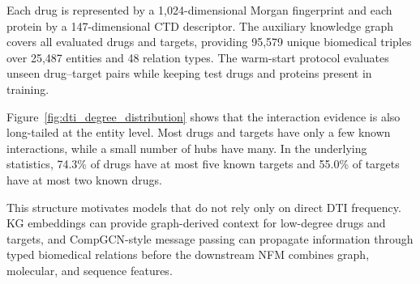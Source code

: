 Each drug is represented by a 1,024-dimensional Morgan fingerprint and each protein by a 147-dimensional CTD descriptor. The auxiliary knowledge graph covers all evaluated drugs and targets, providing 95,579 unique biomedical triples over 25,487 entities and 48 relation types. The warm-start protocol evaluates unseen drug--target pairs while keeping test drugs and proteins present in training.


Figure~\ref{fig:dti_degree_distribution} shows that the interaction evidence is also long-tailed at the entity level. Most drugs and targets have only a few known interactions, while a small number of hubs have many. In the underlying statistics, 74.3\% of drugs have at most five known targets and 55.0\% of targets have at most two known drugs.

This structure motivates models that do not rely only on direct DTI frequency. KG embeddings can provide graph-derived context for low-degree drugs and targets, and CompGCN-style message passing can propagate information through typed biomedical relations before the downstream NFM combines graph, molecular, and sequence features.
